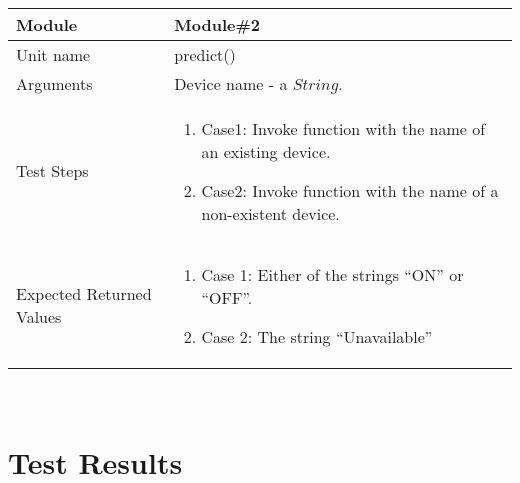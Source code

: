 \\[2\baselineskip]
%
\begin{tabular}{|p{4cm}|p{9cm}|}
\hline
Module & Module\#2 \\
\hline
Unit name & predict() \\
\hline
Arguments & Device name - a $String$. \\
\hline
\vspace*{\baselineskip}Test Steps & \begin{enumerate}
\item[] Case1: Invoke function with the name of an existing device.
\item[] Case2: Invoke function with the name of a non-existent device.
\end{enumerate}\\
\hline
\vspace*{\baselineskip}Expected Returned Values & \begin{enumerate}
\item[] Case 1: Either of the strings ``ON'' or ``OFF''.
\item[] Case 2: The string ``Unavailable''
\end{enumerate} \\
\hline
\end{tabular}
\\[2\baselineskip]

\newpage
\section{Test Results}
